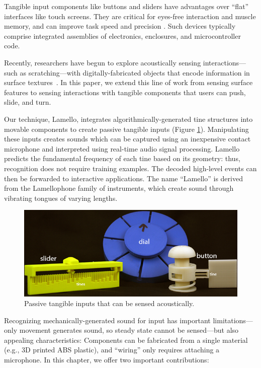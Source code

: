 Tangible input components like buttons and sliders
have advantages over ``flat'' interfaces like touch screens. They are critical for eyes-free interaction and muscle memory, and can improve task speed and precision \cite{klemmer-bodies}. Such devices typically comprise integrated assemblies of electronics, enclosures, and microcontroller code.

Recently, researchers have begun to explore acoustically sensing interactions---such as scratching---with digitally-fabricated objects that encode information in surface textures~\cite{harrison-acoustic,murray-smith-stane}. In this paper, we extend this line of work from sensing surface features to sensing interactions with tangible components that users can push, slide, and turn.

Our technique, Lamello, integrates algorithmically-generated tine structures into movable components to create passive tangible inputs (Figure \ref{fig:lamello-pretty-components}). Manipulating these inputs creates sounds which can be captured using an inexpensive contact microphone and interpreted using real-time audio signal processing. Lamello predicts the fundamental frequency of each tine based on its geometry: thus, recognition does not require training examples. The decoded high-level events can then be forwarded to interactive applications. The name ``Lamello'' is derived from the Lamellophone family of instruments, which create sound through vibrating tongues of varying lengths. 

\begin{figure}[t]
  \centering
    \includegraphics[width=\textwidth]{figures/lamello/fig1-labels-new.jpg}
   \caption{Passive tangible inputs that can be sensed acoustically. %
   }
   \label{fig:lamello-pretty-components}
\end{figure}

Recognizing mechanically-generated sound for input has important limitations---only movement generates sound, so steady state cannot be sensed---but also appealing characteristics: Components can be fabricated from a single material (e.g., 3D printed ABS plastic), and ``wiring'' only requires attaching a microphone. In this chapter, we offer two important contributions:

